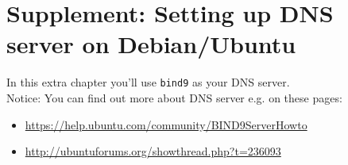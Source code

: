 \documentclass[a4paper,11pt,english]{report}
\def\code#1{\texttt{#1}}
\begin{document}
	
	\chapter{Supplement: Setting up DNS server on Debian/Ubuntu}
		
		In this extra chapter you'll use \code{bind9} as your DNS server. \\
		Notice: You can find out more about DNS server e.g. on these pages:
		
		\begin{itemize}
			\item \url{https://help.ubuntu.com/community/BIND9ServerHowto}
			\item \url{http://ubuntuforums.org/showthread.php?t=236093} \\
		\end{itemize}
		
		
\end{document}
